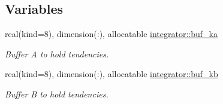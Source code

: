 \subsection*{Variables}
\begin{DoxyCompactItemize}
\item 
real(kind=8), dimension(\+:), allocatable \hyperlink{namespaceintegrator_a2afa4ff98b4a081aab43a4fae62fc8b1}{integrator\+::buf\+\_\+ka}
\begin{DoxyCompactList}\small\item\em Buffer A to hold tendencies. \end{DoxyCompactList}\item 
real(kind=8), dimension(\+:), allocatable \hyperlink{namespaceintegrator_a6d3aa6db72a39f4bc0999ef8056ffba2}{integrator\+::buf\+\_\+kb}
\begin{DoxyCompactList}\small\item\em Buffer B to hold tendencies. \end{DoxyCompactList}\end{DoxyCompactItemize}
